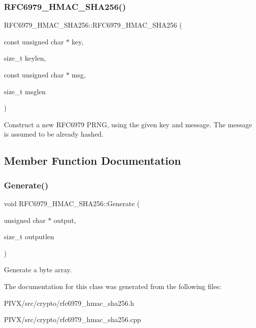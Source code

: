 \subsubsection{\texorpdfstring{R\+F\+C6979\+\_\+\+H\+M\+A\+C\+\_\+\+S\+H\+A256()}{RFC6979\_HMAC\_SHA256()}}
{\footnotesize\ttfamily R\+F\+C6979\+\_\+\+H\+M\+A\+C\+\_\+\+S\+H\+A256\+::\+R\+F\+C6979\+\_\+\+H\+M\+A\+C\+\_\+\+S\+H\+A256 (\begin{DoxyParamCaption}\item[{const unsigned char $\ast$}]{key,  }\item[{size\+\_\+t}]{keylen,  }\item[{const unsigned char $\ast$}]{msg,  }\item[{size\+\_\+t}]{msglen }\end{DoxyParamCaption})}

Construct a new R\+F\+C6979 P\+R\+NG, using the given key and message. The message is assumed to be already hashed. 

\subsection{Member Function Documentation}
\mbox{\label{class_r_f_c6979___h_m_a_c___s_h_a256_a9f841d552097f528631538e9939e0f70}} 
\subsubsection{\texorpdfstring{Generate()}{Generate()}}
{\footnotesize\ttfamily void R\+F\+C6979\+\_\+\+H\+M\+A\+C\+\_\+\+S\+H\+A256\+::\+Generate (\begin{DoxyParamCaption}\item[{unsigned char $\ast$}]{output,  }\item[{size\+\_\+t}]{outputlen }\end{DoxyParamCaption})}

Generate a byte array. 

The documentation for this class was generated from the following files\+:\begin{DoxyCompactItemize}
\item 
P\+I\+V\+X/src/crypto/rfc6979\+\_\+hmac\+\_\+sha256.\+h\item 
P\+I\+V\+X/src/crypto/rfc6979\+\_\+hmac\+\_\+sha256.\+cpp\end{DoxyCompactItemize}
